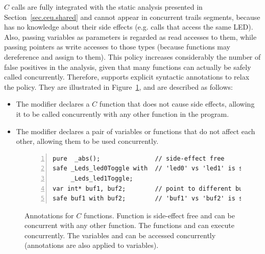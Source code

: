 $C$ calls are fully integrated with the static analysis presented in
Section~\ref{sec.ceu.shared} and cannot appear in concurrent trails segments, 
because \CEU has no knowledge about their side effects (e.g. calls that access 
the same LED).
Also, passing variables as parameters is regarded as read accesses to them, 
while passing pointers as write accesses to those types (because functions may 
dereference and assign to them).
%
This policy increases considerably the number of false positives in the 
analysis, given that many functions can actually be safely called concurrently.
Therefore, \CEU supports explicit syntactic annotations to relax the policy.
They are illustrated in Figure~\ref{lst.annotations}, and are described as 
follows:

\begin{itemize}
\item The  modifier declares a $C$ function that does not cause side 
      effects, allowing it to be called concurrently with any other function in 
the program.
\item The  modifier declares a pair of variables or functions that 
      do not affect each other, allowing them to be used concurrently.
\end{itemize}

%

\begin{figure}[t]
\begin{lstlisting}[numbers=left,xleftmargin=2em]
pure  _abs();               // side-effect free
safe _Leds_led0Toggle with  // 'led0' vs 'led1' is safe
     _Leds_led1Toggle;
var int* buf1, buf2;        // point to different buffers
safe buf1 with buf2;        // 'buf1' vs 'buf2' is safe
\end{lstlisting}
\caption{ Annotations for $C$ functions. \newline
{\small %
Function  is side-effect free and can be concurrent with any other 
function.
The functions  and  can 
execute concurrently.
The variables  and  can be accessed concurrently 
(annotations are also applied to variables).
}%
\label{lst.annotations}
}
\end{figure}

